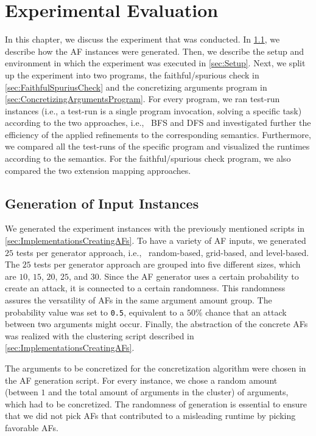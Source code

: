\chapter{Experimental Evaluation}
\label{ch:experiment}
In this chapter, we discuss the experiment that was conducted. In \cref{sec:GenerationOfInputInstances}, we describe how the AF instances were generated. Then, we describe the setup and environment in which the experiment was executed in \cref{sec:Setup}. Next, we split up the experiment into two programs, the faithful/spurious check in \cref{sec:FaithfulSpuriusCheck} and the concretizing arguments program in \cref{sec:ConcretizingArgumentsProgram}. For every program, we ran test-run instances (i.e., a test-run is a single program invocation, solving a specific task) according to the two approaches, i.e., \ BFS and DFS and investigated further the efficiency of the applied refinements to the corresponding semantics. Furthermore, we compared all the test-runs of the specific program and visualized the runtimes according to the semantics. For the faithful/spurious check program, we also compared the two extension mapping approaches.


\section{Generation of Input Instances}
\label{sec:GenerationOfInputInstances}
We generated the experiment instances with the previously mentioned scripts in \cref{sec:ImplementationsCreatingAFs}. To have a variety of AF inputs, we generated $25$ tests per generator approach, i.e., \ random-based, grid-based, and level-based. The $25$ tests per generator approach are grouped into five different sizes, which are $10$, $15$, $20$, $25$, and $30$. Since the AF generator uses a certain probability to create an attack, it is connected to a certain randomness. This randomness assures the versatility of AFs in the same argument amount group. The probability value was set to \texttt{0.5}, equivalent to a $50\%$ chance that an attack between two arguments might occur. Finally, the abstraction of the concrete AFs was realized with the clustering script described in \cref{sec:ImplementationsCreatingAFs}. 

The arguments to be concretized for the concretization algorithm were chosen in the AF generation script. For every instance, we chose a random amount (between $1$ and the total amount of arguments in the cluster) of arguments, which had to be concretized. The randomness of generation is essential to ensure that we did not pick AFs that contributed to a misleading runtime by picking favorable AFs.


